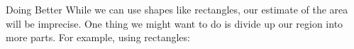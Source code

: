 \documentclass[]{beamer}
\begin{document}
    \begin{frame}{Doing Better}
        While we can use shapes like rectangles, our estimate of the area will be imprecise. One thing we might want to do is divide up our region into more parts. For example, using rectangles:

        \begin{center}

\end{center}
\end{frame}
\end{document}
